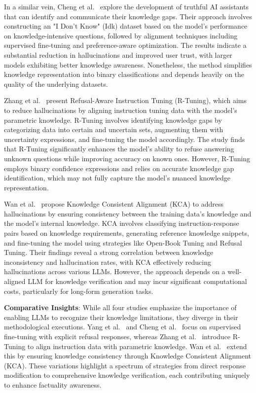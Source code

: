 \documentclass{article}
\begin{document}
In a similar vein, Cheng et al.~\cite{CanAIAssistantsKnowWhat2024} explore the development of truthful AI assistants that can identify and communicate their knowledge gaps. Their approach involves constructing an "I Don't Know" (Idk) dataset based on the model's performance on knowledge-intensive questions, followed by alignment techniques including supervised fine-tuning and preference-aware optimization. The results indicate a substantial reduction in hallucinations and improved user trust, with larger models exhibiting better knowledge awareness. Nonetheless, the method simplifies knowledge representation into binary classifications and depends heavily on the quality of the underlying datasets.

Zhang et al.~\cite{RTuningInstructingLargeLanguageModels2024} present Refusal-Aware Instruction Tuning (R-Tuning), which aims to reduce hallucinations by aligning instruction tuning data with the model's parametric knowledge. R-Tuning involves identifying knowledge gaps by categorizing data into certain and uncertain sets, augmenting them with uncertainty expressions, and fine-tuning the model accordingly. The study finds that R-Tuning significantly enhances the model's ability to refuse answering unknown questions while improving accuracy on known ones. However, R-Tuning employs binary confidence expressions and relies on accurate knowledge gap identification, which may not fully capture the model's nuanced knowledge representation.

Wan et al.~\cite{KnowledgeVerificationNipHallucinationBud2024} propose Knowledge Consistent Alignment (KCA) to address hallucinations by ensuring consistency between the training data's knowledge and the model's internal knowledge. KCA involves classifying instruction-response pairs based on knowledge requirements, generating reference knowledge snippets, and fine-tuning the model using strategies like Open-Book Tuning and Refusal Tuning. Their findings reveal a strong correlation between knowledge inconsistency and hallucination rates, with KCA effectively reducing hallucinations across various LLMs. However, the approach depends on a well-aligned LLM for knowledge verification and may incur significant computational costs, particularly for long-form generation tasks.

\textbf{Comparative Insights}: While all four studies emphasize the importance of enabling LLMs to recognize their knowledge limitations, they diverge in their methodological executions. Yang et al.~\cite{AlignmentHonesty2024} and Cheng et al.~\cite{CanAIAssistantsKnowWhat2024} focus on supervised fine-tuning with explicit refusal responses, whereas Zhang et al.~\cite{RTuningInstructingLargeLanguageModels2024} introduce R-Tuning to align instruction data with parametric knowledge. Wan et al.~\cite{KnowledgeVerificationNipHallucinationBud2024} extend this by ensuring knowledge consistency through Knowledge Consistent Alignment (KCA). These variations highlight a spectrum of strategies from direct response modification to comprehensive knowledge verification, each contributing uniquely to enhance factuality awareness.
\end{document}
